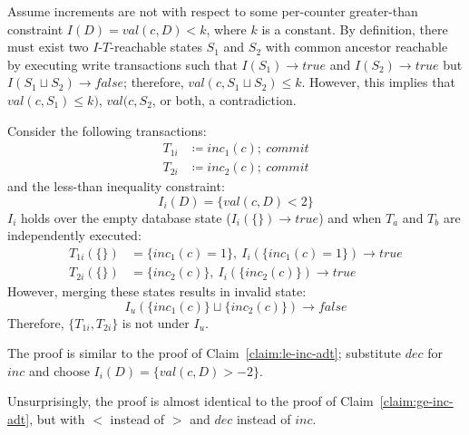 \begin{claim} \label{claim:ge-inc-adt}
Assume increments are not \iconfluent with respect to some per-counter greater-than constraint $I(D)=val(c, D) < k$, where $k$ is a constant. By definition, there must exist two $I$-$T$-reachable states $S_1$ and $S_2$ with common ancestor reachable by executing write transactions such that $I(S_1) \rightarrow true$ and $I(S_2) \rightarrow true$ but $I(S_1 \sqcup S_2) \rightarrow false$; therefore, $val(c, S_1 \sqcup S_2) \leq k$. However, this implies that $val(c, S_1) \leq k)$, $val(c, S_2$, or both, a contradiction.  \end{claim}

\begin{claim}
\label{claim:le-inc-adt}
Consider the following transactions:
\begin{align*}
T_{1i}&\coloneqq inc_1(c);~commit\\
T_{2i}&\coloneqq inc_2(c);~commit
\end{align*}
and the less-than inequality constraint:
$$I_i(D) = \{val(c, D) < 2\}$$
$I_i$ holds over the empty database state ($I_i(\{\}) \rightarrow true$) and when $T_a$ and $T_b$ are independently executed:
\begin{align*}
T_{1i}(\{\})&=\{inc_1(c)=1\},~I_i(\{inc_1(c)=1\}) \rightarrow true\\
T_{2i}(\{\})&=\{inc_2(c)\},~I_i(\{inc_2(c)\}) \rightarrow true
\end{align*}
However, merging these states results in invalid state:
$$I_u(\{inc_1(c)\}\sqcup \{inc_2(c)\}) \rightarrow false$$
Therefore, $\{T_{1i}, T_{2i}\}$ is not \iconfluent under $I_u$.
\end{claim}

\begin{claim} The proof is similar to the proof of Claim~\ref{claim:le-inc-adt}; substitute $dec$ for $inc$ and choose $I_i(D) = \{val(c,D) > -2\}$.  \end{claim}

\begin{claim} \label{claim:le-inc-adt} Unsurprisingly, the proof is almost identical to the proof of Claim~\ref{claim:ge-inc-adt}, but with $<$ instead of $>$ and $dec$ instead of $inc$. \end{claim}


